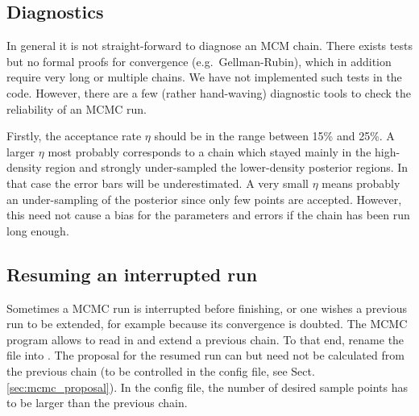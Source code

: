 \documentclass[11pt, chapterprefix, headsepline]{scrartcl}
\begin{document}
\begin{appendix}


\subsection{Diagnostics}

In general it is not straight-forward to diagnose an MCM chain. There
exists tests but no formal proofs for convergence
(e.g.~Gellman-Rubin), which in addition require very long or multiple
chains. We have not implemented such tests in the code. However,
there are a few (rather hand-waving) diagnostic tools to check the
reliability of an MCMC run.

Firstly, the acceptance rate $\eta$ should be in the range between
15\% and 25\%. A larger $\eta$ most probably corresponds to a chain
which stayed mainly in the high-density region and strongly
under-sampled the lower-density posterior regions. In that case the
error bars will be underestimated. A very small $\eta$ means probably
an under-sampling of the posterior since only few points are
accepted. However, this need not cause a bias for the parameters and
errors if the chain has been run long enough.


\subsection{Resuming an interrupted run}

Sometimes a MCMC run is interrupted before finishing, or one wishes a
previous run to be extended, for example because its convergence is
doubted. The MCMC program allows to read in and extend a previous
chain. To that end, rename the file  into
. The proposal for the resumed run can but need not
be calculated from the previous chain (to be controlled in the config
file, see Sect.\ref{sec:mcmc_proposal}). In the config file, the
number of desired sample points has to be larger than the previous
chain.

\end{appendix}




\end{document}
